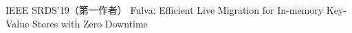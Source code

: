 \cventry
{IEEE SRDS'19（第一作者）} %
{Fulva: Efficient Live Migration for In-memory Key-Value Stores with Zero Downtime} %
{} %
{} %
{ %
}
